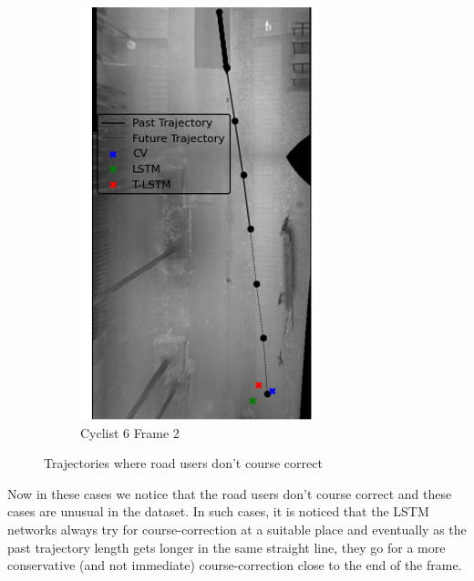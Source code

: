 \documentclass{article}
\begin{document}
\begin{figure}[H]
\begin{subfigure}{0.40\textwidth}
  \includegraphics[width=\linewidth]{quali_results/cyc-6-2.png}
  \caption{Cyclist 6 Frame 2}
  \label{fig:cyc6-2}
\end{subfigure}
\caption{Trajectories where road users don't course correct}
\label{fig:cyc5&6}
\end{figure}

Now in these cases we notice that the road users don't course correct and these cases are unusual in the dataset. In such cases, it is noticed that the LSTM networks always try for course-correction at a suitable place and eventually as the past trajectory length gets longer in the same straight line, they go for a more conservative (and not immediate) course-correction close to the end of the frame. 
\end{document}

